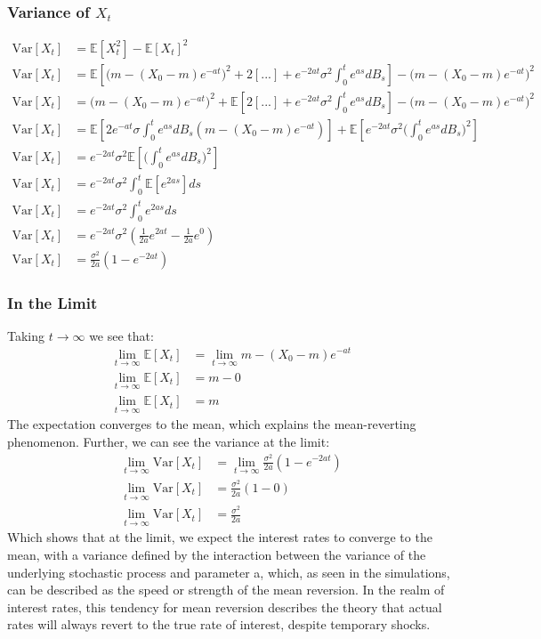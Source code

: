 \documentclass[a4paper,12pt]{article}
\begin{document}
\subsubsection*{Variance of $X_t$}
\begin{align*}
\text{Var}[X_t] &= \mathbb{E}[X_t^2] - \mathbb{E}[X_t]^2 \\
\text{Var}[X_t] &= \mathbb{E}[\big( m - (X_0 - m) e^{-at} \big)^2 + 2[...] + e^{-2at}\sigma^2 \int_0^t e^{as}dB_s ] -  \big( m - (X_0 - m) e^{-at} \big)^2 \\
\text{Var}[X_t] &= \big( m - (X_0 - m) e^{-at} \big)^2 + \mathbb{E}[ 2[...] + e^{-2at}\sigma^2 \int_0^t e^{as}dB_s ] -  \big( m - (X_0 - m) e^{-at} \big)^2 \\
\text{Var}[X_t] &=  \mathbb{E}[ 2e^{-at}\sigma\int_0^te^{as}dB_s(m - (X_0 - m)e^{-at})] + \mathbb{E} [ e^{-2at}\sigma^2 \big( \int_0^t e^{as}dB_s\big)^2 ] \\
\text{Var}[X_t] &=  e^{-2at}\sigma^2 \mathbb{E} [\big( \int_0^t e^{as}dB_s\big)^2 ] \\
\text{Var}[X_t] &=  e^{-2at}\sigma^2 \int_0^t \mathbb{E} [e^{2as}]ds \\
\text{Var}[X_t] &=  e^{-2at}\sigma^2 \int_0^t e^{2as}ds \\
\text{Var}[X_t] &=  e^{-2at}\sigma^2 (\frac{1}{2a}e^{2at} - \frac{1}{2a}e^{0}) \\
\text{Var}[X_t] &=  \frac{\sigma^2}{2a}(1 - e^{-2at})
\end{align*}

\subsubsection*{In the Limit}
Taking $ t \rightarrow \infty$ we see that:
\begin{align*}
\lim_{t \rightarrow \infty} \mathbb{E}[X_t] &= \lim_{t \rightarrow \infty} m - (X_0 - m) e^{-at} \\
\lim_{t \rightarrow \infty} \mathbb{E}[X_t] &= m - 0 \\
\lim_{t \rightarrow \infty} \mathbb{E}[X_t] &= m
\end{align*}
The expectation converges to the mean, which explains the mean-reverting phenomenon. Further, we can see the variance at the limit:
\begin{align*}
\lim_{t \rightarrow \infty} \text{Var}[X_t] &=  \lim_{t \rightarrow \infty} \frac{\sigma^2}{2a}(1 - e^{-2at}) \\
\lim_{t \rightarrow \infty} \text{Var}[X_t] &=  \frac{\sigma^2}{2a}(1 - 0) \\
\lim_{t \rightarrow \infty} \text{Var}[X_t] &=  \frac{\sigma^2}{2a}
\end{align*}
%
Which shows that at the limit, we expect the interest rates to converge to the mean, with a variance defined by the interaction between the variance of the underlying stochastic process and parameter a, which, as seen in the simulations, can be described as the speed or strength of the mean reversion. In the realm of interest rates, this tendency for mean reversion describes the theory that actual rates will always revert to the true rate of interest, despite temporary shocks.
%
\end{document}
